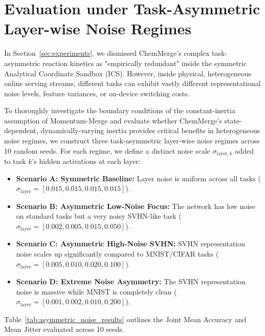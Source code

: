 \documentclass{article}
\theoremstyle{plain}
\theoremstyle{definition}
\theoremstyle{remark}
\begin{document}
    \section{Evaluation under Task-Asymmetric Layer-wise Noise Regimes}
    \label{app:asymmetric_noise}
    In Section~\ref{sec:experiments}, we dismissed ChemMerge's complex task-asymmetric reaction kinetics as "empirically redundant" inside the symmetric Analytical Coordinate Sandbox (ICS). However, inside physical, heterogeneous online serving streams, different tasks can exhibit vastly different representational noise levels, feature variances, or on-device switching costs. 
    
    To thoroughly investigate the boundary conditions of the constant-inertia assumption of Momentum-Merge and evaluate whether ChemMerge's state-dependent, dynamically-varying inertia provides critical benefits in heterogeneous noise regimes, we construct three task-asymmetric layer-wise noise regimes across 10 random seeds. For each regime, we define a distinct noise scale $\sigma_{\text{layer}, k}$ added to task $k$'s hidden activations at each layer:
    \begin{itemize}
        \item \textbf{Scenario A: Symmetric Baseline:} Layer noise is uniform across all tasks ($\sigma_{\text{layer}} = [0.015, 0.015, 0.015, 0.015]$).
        \item \textbf{Scenario B: Asymmetric Low-Noise Focus:} The network has low noise on standard tasks but a very noisy SVHN-like task ($\sigma_{\text{layer}} = [0.002, 0.005, 0.015, 0.050]$).
        \item \textbf{Scenario C: Asymmetric High-Noise SVHN:} SVHN representation noise scales up significantly compared to MNIST/CIFAR tasks ($\sigma_{\text{layer}} = [0.005, 0.010, 0.020, 0.100]$).
        \item \textbf{Scenario D: Extreme Noise Asymmetry:} The SVHN representation noise is massive while MNIST is completely clean ($\sigma_{\text{layer}} = [0.001, 0.002, 0.010, 0.200]$).
    \end{itemize}

    Table~\ref{tab:asymmetric_noise_results} outlines the Joint Mean Accuracy and Mean Jitter evaluated across 10 seeds.
\end{document}
